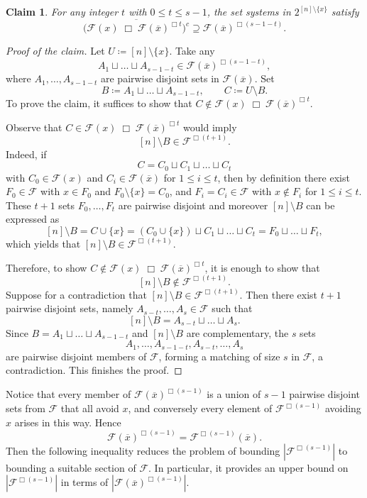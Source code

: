 \documentclass[11pt]{article}
\newtheorem{claim}[theorem]{Claim}
\theoremstyle{definition}
\newenvironment{poc}{\begin{proof}[Proof of the claim]\renewcommand*{\qedsymbol}{$\blacksquare$}}{\end{proof}}
\begin{document}
\begin{claim}\label{prop:inclusion}
 For any integer $t$ with $0\le t\le s-1$, the set systems in \(2^{[n]\setminus\{x\}}\) satisfy
   \[
      \overline{\bigl(\mathcal{F}(x)\;\Box\; \mathcal{F}(\overline{x})^{\Box t}\bigr)^{c}}
      \supseteq
      \mathcal{F}(\overline{x})^{\Box (s-1-t)}.
   \]
\end{claim}
\begin{poc}
Let $U\coloneqq [n]\setminus\{x\}$.
Take any
\[
   A_1\sqcup \dots \sqcup A_{s-1-t}\in \mathcal{F}(\overline{x})^{\Box (s-1-t)},
\]
where $A_1,\dots,A_{s-1-t}$ are pairwise disjoint sets in $\mathcal{F}(\overline{x})$.
Set
\[
   B \coloneqq A_1\sqcup \dots \sqcup A_{s-1-t},
   \qquad
   C \coloneqq U\setminus B.
\]
To prove the claim, it suffices to show that $C\notin \mathcal{F}(x)\;\Box\; \mathcal{F}(\overline{x})^{\Box t}$.

Observe that $C\in \mathcal{F}(x)\;\Box\; \mathcal{F}(\overline{x})^{\Box t}$ would imply
\[
   [n]\setminus B \in \mathcal{F}^{\Box (t+1)}.
\]
Indeed, if
\[
   C = C_0 \sqcup C_1 \sqcup \dots \sqcup C_t
\]
with $C_0\in\mathcal{F}(x)$ and $C_i\in\mathcal{F}(\overline{x})$ for $1\le i\le t$, then by definition
there exist $F_0\in\mathcal{F}$ with $x\in F_0$ and $F_0\setminus\{x\}=C_0$, and
$F_i = C_i\in\mathcal{F}$ with $x\notin F_i$ for $1\le i\le t$.
These $t+1$ sets $F_0,\dots,F_t$ are pairwise disjoint and moreover \([n]\setminus B\) can be expressed as
\[
  [n]\setminus B = C\cup\{x\} = (C_0\cup\{x\}) \sqcup C_1 \sqcup\dots\sqcup C_t
   = F_0\sqcup \dots \sqcup F_t,
\]
which yields that $[n]\setminus B\in\mathcal{F}^{\Box (t+1)}$.

Therefore, to show $C\notin \mathcal{F}(x)\;\Box\; \mathcal{F}(\overline{x})^{\Box t}$, it is enough to show that
\[
   [n]\setminus B \notin \mathcal{F}^{\Box (t+1)}.
\]
Suppose for a contradiction that
\(
   [n]\setminus B \in \mathcal{F}^{\Box (t+1)}.
\)
Then there exist $t+1$ pairwise disjoint sets, namely
\(
   A_{s-t},\dots,A_s \in \mathcal{F}
\)
such that
\[
   [n]\setminus B
   = A_{s-t}\sqcup\dots\sqcup A_s.
\]
Since $B = A_1\sqcup \dots \sqcup A_{s-1-t}$ and $[n]\setminus B$ are complementary, the $s$ sets
\[
   A_1,\dots,A_{s-1-t},A_{s-t},\dots,A_s
\]
are pairwise disjoint members of $\mathcal{F}$, forming a matching of size $s$ in $\mathcal{F}$, a contradiction. This finishes the proof.
\end{poc}
Notice that every member of $\mathcal{F}(\overline{x})^{\Box (s-1)}$ is a union of
$s-1$ pairwise disjoint sets from $\mathcal{F}$ that all avoid $x$, and conversely
every element of $\mathcal{F}^{\Box (s-1)}$ avoiding $x$ arises in this way. Hence
\begin{equation}\label{eq:exchange1}
    \mathcal{F}(\overline{x})^{\Box (s-1)}
   = \mathcal{F}^{\Box (s-1)}(\overline{x}).
\end{equation}
Then the following inequality reduces the problem of bounding $|\mathcal{F}^{\Box (s-1)}|$
to bounding a suitable section of $\mathcal{F}$. In particular, it provides an
upper bound on $|\mathcal{F}^{\Box (s-1)}|$ in terms of
$|\mathcal{F}(\overline{x})^{\Box (s-1)}|$.
\end{document}
